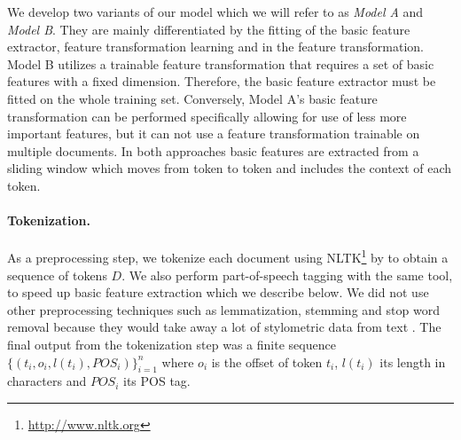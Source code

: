 \documentclass[10pt, a4paper]{article}
\begin{document}
We develop two variants of our model which we will refer to as \emph{Model A} and \emph{Model B}. They are mainly differentiated by the fitting of the basic feature extractor, feature transformation learning and in the feature transformation. Model B utilizes a trainable feature transformation that requires a set of basic features with a fixed dimension. Therefore, the basic feature extractor must be fitted on the whole training set. Conversely, Model A's basic feature transformation can be performed specifically allowing for use of less more important features, but it can not use a feature transformation trainable on multiple documents. In both approaches basic features are extracted from a sliding window which moves from token to token and includes the context of each token.

\paragraph{Tokenization.} As a preprocessing step, we tokenize each document using NLTK\footnote{\url{http://www.nltk.org}} by \citet{bird-2009} to obtain a sequence of tokens $D$. We also perform part-of-speech tagging with the same tool, to speed up basic feature extraction which we describe below. We did not use other preprocessing techniques such as lemmatization, stemming and stop word removal because they would take away a lot of stylometric data from text \cite{stamatatos-2009a}. The final output from the tokenization step was a finite sequence $\{(t_i, o_i, l(t_i), \mathit{POS}_i)\}_{i=1}^n$ where $o_i$ is the offset of token $t_i$, $l(t_i)$ its length in characters and $\mathit{POS}_i$ its POS tag.
\end{document}
